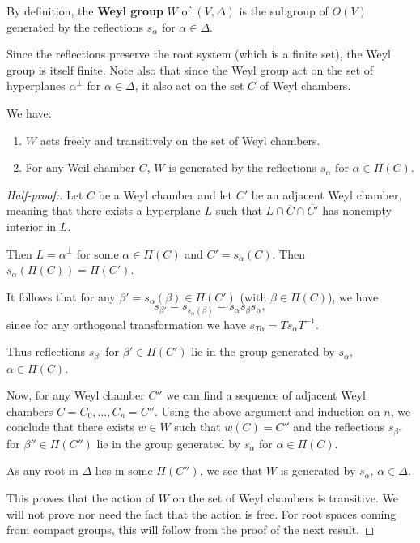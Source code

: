 \documentclass[11pt, english]{article}
\begin{document}
By definition, the \textbf{Weyl group} $W$ of $(V,\Delta)$ is the subgroup of $O(V)$ generated by the reflections $s_\alpha$ for $\alpha \in \Delta$. 

Since the reflections preserve the root system (which is a finite set), the Weyl group is itself finite. Note also that since the Weyl group act on the set of hyperplanes $\alpha^\perp$ for $\alpha \in \Delta$, it also act on the set $C$ of Weyl chambers. 

\begin{thm}
 We have:
 \begin{enumerate}
 \item $W$ acts freely and transitively on the set of Weyl chambers.
\item For any Weil chamber $C$, $W$ is generated by the reflections $s_\alpha$ for $\alpha \in \Pi(C)$. 
 \end{enumerate}
\end{thm}
\begin{proof}[Half-proof:]
 Let $C$ be a Weyl chamber and let $C'$ be an adjacent Weyl chamber, meaning that there exists a hyperplane $L$ such that $L \cap \overline C \cap \overline {C'}$ has nonempty interior in $L$.

Then $L = \alpha^\perp$ for some $\alpha \in \Pi(C)$ and $C' = s_\alpha(C)$. Then $s_\alpha(\Pi(C))=\Pi(C')$. 

It follows that for any $\beta'= s_\alpha(\beta) \in \Pi(C')$ (with $\beta \in \Pi(C)$), we have $$s_{\beta'} = s_{s_\alpha(\beta)} = s_\alpha s_\beta s_\alpha,$$
since for any orthogonal transformation we have $s_{T\alpha} = Ts_\alpha T^{-1}$. 

Thus reflections $s_{\beta'}$ for $\beta' \in \Pi(C')$ lie in the group generated by $s_\alpha$, $\alpha \in \Pi(C)$. 

Now, for any Weyl chamber $C''$ we can find a sequence of adjacent Weyl chambers $C=C_0, \ldots,C_n=C''$. Using the above argument and induction on $n$, we conclude that there exists $w \in W$ such that $w(C)=C''$ and the reflections $s_{\beta''}$ for $\beta'' \in \Pi(C'')$ lie in the group generated by $s_\alpha$ for $\alpha \in \Pi(C)$. 

As any root in $\Delta$ lies in some $\Pi(C'')$, we see that $W$ is generated by $s_\alpha$, $\alpha \in \Delta$.

This proves that the action of $W$ on the set of Weyl chambers is transitive. We will not prove nor need the fact that the action is free. For root spaces coming from compact groups, this will follow from the proof of the next result.
\end{proof}
\end{document}
